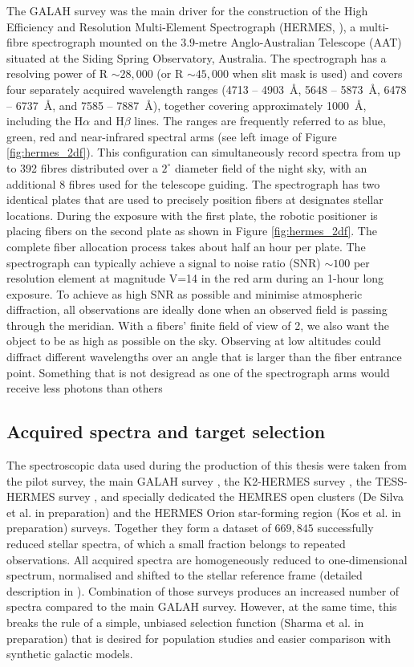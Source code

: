 The GALAH survey was the main driver for the construction of the High Efficiency and Resolution Multi-Element Spectrograph (HERMES, \cite{2010SPIE.7735E..09B, 2015JATIS...1c5002S}), a multi-fibre spectrograph mounted on the $3.9$-metre Anglo-Australian Telescope (AAT) situated at the Siding Spring Observatory, Australia. The spectrograph has a resolving power of R $\sim 28,000$ (or R $\sim 45,000$ when slit mask is used) and covers four separately acquired wavelength ranges (4713 -- 4903~\AA, 5648 -- 5873~\AA, 6478 -- 6737~\AA, and 7585 -- 7887~\AA), together covering approximately 1000~\AA, including the H$\alpha$ and H$\beta$ lines. The ranges are frequently referred to as blue, green, red and near-infrared spectral arms (see left image of Figure \ref{fig:hermes_2df}). This configuration can simultaneously record spectra from up to 392 fibres distributed over a $2^\circ$ diameter field of the night sky, with an additional 8 fibres used for the telescope guiding. The spectrograph has two identical plates that are used to precisely position fibers at designates stellar locations. During the exposure with the first plate, the robotic positioner is placing fibers on the second plate as shown in Figure \ref{fig:hermes_2df}. The complete fiber allocation process takes about half an hour per plate. The spectrograph can typically achieve a signal to noise ratio (SNR) $\sim100$ per resolution element at magnitude V=14 in the red arm during an 1-hour long exposure. To achieve as high SNR as possible and minimise atmospheric diffraction, all observations are ideally done when an observed field is passing through the meridian. With a fibers' finite field of view of 2\arcsec, we also want the object to be as high as possible on the sky. Observing at low altitudes could diffract different wavelengths over an angle that is larger than the fiber entrance point. Something that is not desigread as one of the spectrograph arms would receive less photons than others

\subsection{Acquired spectra and target selection}
The spectroscopic data used during the production of this thesis were taken from the pilot survey, the main GALAH survey \cite{2015MNRAS.449.2604D}, the K2-HERMES survey \cite{2018AJ....155...84W}, the TESS-HERMES survey \cite{2018MNRAS.473.2004S}, and specially dedicated the HEMRES open clusters (De Silva et al. in preparation) and the HERMES Orion star-forming region (Kos et al. in preparation) surveys. Together they form a dataset of $669,845$ successfully reduced stellar spectra, of which a small fraction belongs to repeated observations. All acquired spectra are homogeneously reduced to one-dimensional spectrum, normalised and shifted to the stellar reference frame (detailed description in \citet{2017MNRAS.464.1259K}). Combination of those surveys produces an increased number of spectra compared to the main GALAH survey. However, at the same time, this breaks the rule of a simple, unbiased selection function (Sharma et al. in preparation) that is desired for population studies and easier comparison with synthetic galactic models.

